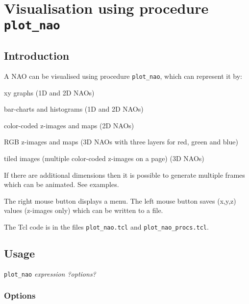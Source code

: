 
\section{Visualisation using procedure \texttt{plot\_nao}}
    \label{plot-nao}

\subsection{Introduction}
    \label{plot-nao-Introduction}

A NAO can be visualised using procedure 
  \texttt{plot\_nao}, which can represent it by:
\begin{bullets}
    \item xy graphs (1D and 2D NAOs)
    \item bar-charts and histograms (1D and 2D NAOs)
    \item color-coded z-images and maps (2D NAOs)
    \item RGB z-images and maps (3D NAOs with three layers for red, green
    and blue)
    \item tiled images (multiple color-coded z-images on a page) (3D
    NAOs)
\end{bullets}
If there are additional dimensions then it is possible to
  generate multiple frames which can be animated. See examples.
  
The right mouse button displays a menu. The left mouse button
  saves (x,y,z) values (z-images only) which can be written to a
  file.
  
The Tcl code is in the files 
  \texttt{plot\_nao.tcl} and 
  \texttt{plot\_nao\_procs.tcl}.

\subsection{Usage}
    \label{plot-nao-Usage}

  \texttt{plot\_nao} 
  \emph{expression ?options?}

\subsubsection{Options}
    \label{plot-nao-Options}

